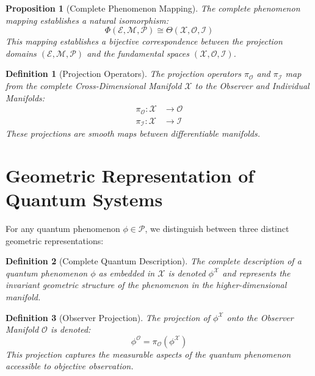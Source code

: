 \documentclass{article}
\newtheorem{definition}{Definition}
\newtheorem{proposition}{Proposition}
\begin{document}
\begin{proposition}[Complete Phenomenon Mapping]
The complete phenomenon mapping establishes a natural isomorphism:
\begin{equation}
\Phi(\mathcal{E}, \mathcal{M}, \mathcal{P}) \cong \Theta(\mathcal{X}, \mathcal{O}, \mathcal{I})
\end{equation}
This mapping establishes a bijective correspondence between the projection domains $(\mathcal{E}, \mathcal{M}, \mathcal{P})$ and the fundamental spaces $(\mathcal{X}, \mathcal{O}, \mathcal{I})$.
\end{proposition}

\begin{definition}[Projection Operators]
The projection operators $\pi_{\mathcal{O}}$ and $\pi_{\mathcal{I}}$ map from the complete Cross-Dimensional Manifold $\mathcal{X}$ to the Observer and Individual Manifolds:
\begin{align}
\pi_{\mathcal{O}}: \mathcal{X} &\to \mathcal{O} \\
\pi_{\mathcal{I}}: \mathcal{X} &\to \mathcal{I}
\end{align}
These projections are smooth maps between differentiable manifolds.
\end{definition}

\section{Geometric Representation of Quantum Systems}

For any quantum phenomenon $\phi \in \mathcal{P}$, we distinguish between three distinct geometric representations:

\begin{definition}[Complete Quantum Description]
The complete description of a quantum phenomenon $\phi$ as embedded in $\mathcal{X}$ is denoted $\phi^{\mathcal{X}}$ and represents the invariant geometric structure of the phenomenon in the higher-dimensional manifold.
\end{definition}

\begin{definition}[Observer Projection]
The projection of $\phi^{\mathcal{X}}$ onto the Observer Manifold $\mathcal{O}$ is denoted:
\begin{equation}
\phi^{\mathcal{O}} = \pi_{\mathcal{O}}(\phi^{\mathcal{X}})
\end{equation}
This projection captures the measurable aspects of the quantum phenomenon accessible to objective observation.
\end{definition}
\end{document}
